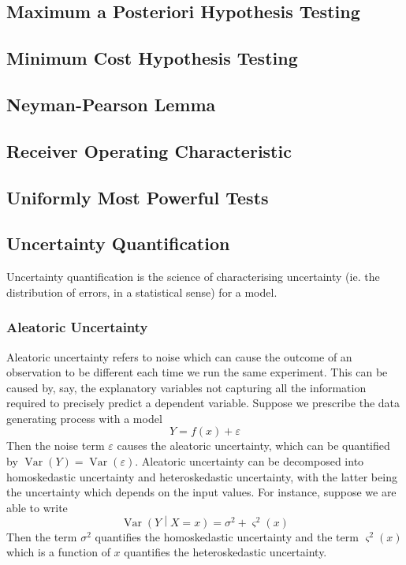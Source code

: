 \documentclass[11pt]{report} %
\begin{document}
\subsection{Maximum a Posteriori Hypothesis Testing}

\subsection{Minimum Cost Hypothesis Testing}

\subsection{Neyman-Pearson Lemma}

\subsection{Receiver Operating Characteristic}

\subsection{Uniformly Most Powerful Tests}

\subsection{Uncertainty Quantification}

Uncertainty quantification is the science of characterising uncertainty (ie. the distribution of errors, in a statistical sense) for a model.

\subsubsection{Aleatoric Uncertainty}

Aleatoric uncertainty refers to noise which can cause the outcome of an observation to be different each time we run the same experiment. This can be caused by, say, the explanatory variables not capturing all the information required to precisely predict a dependent variable. Suppose we prescribe the data generating process with a model
\begin{equation}
Y = f\left(x\right) + \varepsilon
\end{equation}
Then the noise term $\varepsilon$ causes the aleatoric uncertainty, which can be quantified by $\operatorname{Var}\left(Y\right) = \operatorname{Var}\left(\varepsilon\right)$. Aleatoric uncertainty can be decomposed into homoskedastic uncertainty and heteroskedastic uncertainty, with the latter being the uncertainty which depends on the input values. For instance, suppose we are able to write
\begin{equation}
\operatorname{Var}\left(Y\middle| X = x\right) = \sigma^{2} + \varsigma^{2}\left(x\right)
\end{equation}
Then the term $\sigma^{2}$ quantifies the homoskedastic uncertainty and the term $\varsigma^{2}\left(x\right)$ which is a function of $x$ quantifies the heteroskedastic uncertainty.
\end{document}
